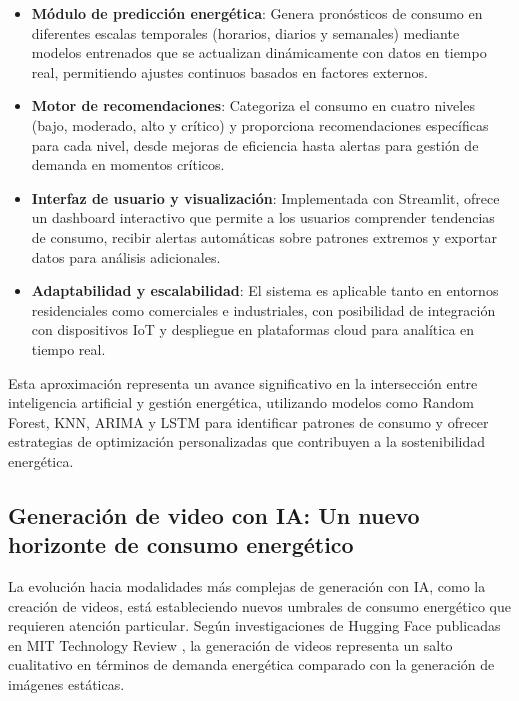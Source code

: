 \begin{itemize}
    \item \textbf{Módulo de predicción energética}: Genera pronósticos de consumo en diferentes escalas temporales (horarios, diarios y semanales) mediante modelos entrenados que se actualizan dinámicamente con datos en tiempo real, permitiendo ajustes continuos basados en factores externos.
    
    \item \textbf{Motor de recomendaciones}: Categoriza el consumo en cuatro niveles (bajo, moderado, alto y crítico) y proporciona recomendaciones específicas para cada nivel, desde mejoras de eficiencia hasta alertas para gestión de demanda en momentos críticos.
    
    \item \textbf{Interfaz de usuario y visualización}: Implementada con Streamlit, ofrece un dashboard interactivo que permite a los usuarios comprender tendencias de consumo, recibir alertas automáticas sobre patrones extremos y exportar datos para análisis adicionales.
    
    \item \textbf{Adaptabilidad y escalabilidad}: El sistema es aplicable tanto en entornos residenciales como comerciales e industriales, con posibilidad de integración con dispositivos IoT y despliegue en plataformas cloud para analítica en tiempo real.
\end{itemize}

Esta aproximación representa un avance significativo en la intersección entre inteligencia artificial y gestión energética, utilizando modelos como Random Forest, KNN, ARIMA y LSTM para identificar patrones de consumo y ofrecer estrategias de optimización personalizadas que contribuyen a la sostenibilidad energética.

\subsection{Generación de video con IA: Un nuevo horizonte de consumo energético}

La evolución hacia modalidades más complejas de generación con IA, como la creación de videos, está estableciendo nuevos umbrales de consumo energético que requieren atención particular. Según investigaciones de Hugging Face publicadas en MIT Technology Review \cite{luccioni2025ai}, la generación de videos representa un salto cualitativo en términos de demanda energética comparado con la generación de imágenes estáticas.

